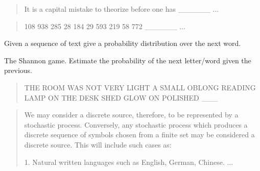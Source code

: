 \documentclass{beamer}
\newcommand{\air}{\vspace{0.25cm}}
\begin{document}
\begin{frame}


  \air
   {
    \begin{quote}
    It is a capital mistake to theorize before one has \_\_\_\_\_\_ $\ldots$ 
    \end{quote}
  }
   {
    \begin{quote}
      108 938 285 28 184 29 593 219 58 772 \_\_\_\_\_\_ $\ldots$ 
    \end{quote}    
  }
\end{frame}



\begin{frame}
  \begin{center}
  \end{center}
  Given a sequence of text give a probability distribution 
  over the next word. 

\air

  The Shannon game. Estimate the probability of the next letter/word
  given the previous.

  \begin{quote}
    THE ROOM WAS NOT VERY LIGHT A SMALL OBLONG READING LAMP ON THE
    DESK SHED GLOW ON POLISHED \_\_\_\
  \end{quote}


\end{frame}


\begin{frame}
  \begin{center}
  \end{center}
\air
  
\begin{quote}  
  We may consider a discrete source, therefore,
to be represented by a stochastic process. Conversely, any stochastic
process which produces a discrete sequence of symbols chosen from a finite
set may be considered a discrete source. This will include such cases as:

1. Natural written languages such as English, German, Chinese.
...
\end{quote}
\end{frame}
\end{document}
